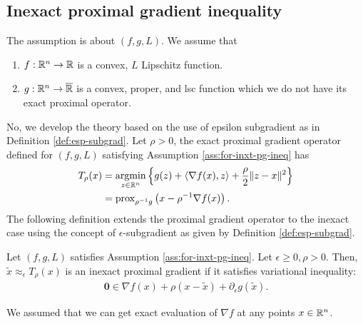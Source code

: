 \documentclass[12pt]{article}
\begin{document}
    \subsection{Inexact proximal gradient inequality}
        \begin{assumption}\label{ass:for-inxt-pg-ineq}
            The assumption is about $(f, g, L)$. 
            We assume that 
            \begin{enumerate}[nosep]
                \item $f: \mathbb R^n \rightarrow \mathbb R$ is a convex, $L$ Lipschitz function. 
                \item $g: \mathbb R^n \rightarrow \overline{\mathbb R}$ is a convex, proper, and lsc function which we do not have its exact proximal operator. 
            \end{enumerate}
        \end{assumption}
        No, we develop the theory based on the use of epsilon subgradient as in Definition \ref{def:esp-subgrad}. 
        Let $\rho > 0$, the exact proximal gradient operator defined for $(f, g, L)$ satisfying Assumption \ref{ass:for-inxt-pg-ineq} has
        \begin{align*}
            T_{\rho}(x) &= \mathop{\rm argmin}\limits_{z\in\mathbb R^n}\left\lbrace g(z) + \langle \nabla f(x), z\rangle + \frac{\rho}{2}\Vert z - x\Vert^2 \right\rbrace
            \\
            &= \operatorname{prox}_{\rho^{-1} g}\left(x - \rho^{-1}\nabla f(x)\right). 
        \end{align*}
        The following definition extends the proximal gradient operator to the inexact case using the concept of $\epsilon$-subgradient as given by Definition \ref{def:esp-subgrad}. 
        \begin{definition}\label{def:inxt-pg}
            Let $(f, g, L)$ satisfies Assumption \ref{ass:for-inxt-pg-ineq}. 
            Let $\epsilon \ge 0, \rho > 0$. 
            Then, $\tilde x \approx_\epsilon T_\rho(x)$ is an inexact proximal gradient if it satisfies variational inequality: 
            \begin{align*}
                \mathbf 0 \in \nabla f(x) + \rho(x - \tilde x) + \partial_{\epsilon} g(\tilde x). 
            \end{align*}
        \end{definition}
        \begin{remark}
            We assumed that we can get exact evaluation of $\nabla f$ at any points $x \in \mathbb R^n$. 
        \end{remark}
\end{document}
